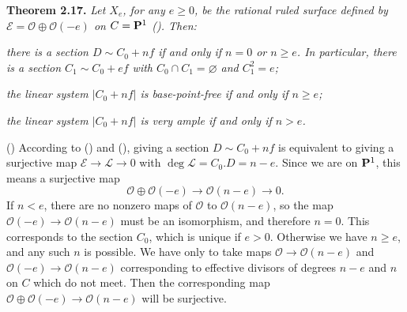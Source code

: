 {\medskip
\noindent\hypertarget{result-V-2.17}{}\textbf{Theorem 2.17.} \emph{Let $X_e$, for any $e\ge0$, be the rational ruled surface defined by $\mathcal E=\mathcal O\oplus\mathcal O(-e)$ on $C=\mathbf{P}^1$ \textup{()}. Then:}
\begin{parts}
\item\hypertarget{result-V-2.17a}{} \emph{there is a section $D\sim C_0+nf$ if and only if $n=0$ or $n\ge e$. In particular, there is a section $C_1\sim C_0+ef$ with $C_0\cap C_1=\varnothing$ and $C_1^2=e$;}
\item\hypertarget{result-V-2.17b}{} \emph{the linear system $|C_0+nf|$ is base-point-free if and only if $n\ge e$;}
\item\hypertarget{result-V-2.17c}{} \emph{the linear system $|C_0+nf|$ is very ample if and only if $n>e$.}
\end{parts}

\Proof\par
() According to () and (), giving a section $D\sim C_0+nf$ is equivalent to giving a surjective map $\mathcal E\to\mathcal L\to0$ with $\deg\mathcal L=C_0.D=n-e$. Since we are on $\mathbf{P}^1$, this means a surjective map
\[
\mathcal O\oplus\mathcal O(-e)\longrightarrow\mathcal O(n-e)\longrightarrow0.
\]
\noindent If $n<e$, there are no nonzero maps of $\mathcal O$ to $\mathcal O(n-e)$, so the map $\mathcal O(-e)\to\mathcal O(n-e)$ must be an isomorphism, and therefore $n=0$. This corresponds to the section $C_0$, which is unique if $e>0$. Otherwise we have $n\ge e$, and any such $n$ is possible. We have only to take maps $\mathcal O\to\mathcal O(n-e)$ and $\mathcal O(-e)\to\mathcal O(n-e)$ corresponding to effective divisors of degrees $n-e$ and $n$ on $C$ which do not meet. Then the corresponding map $\mathcal O\oplus\mathcal O(-e)\to\mathcal O(n-e)$ will be surjective.
}
